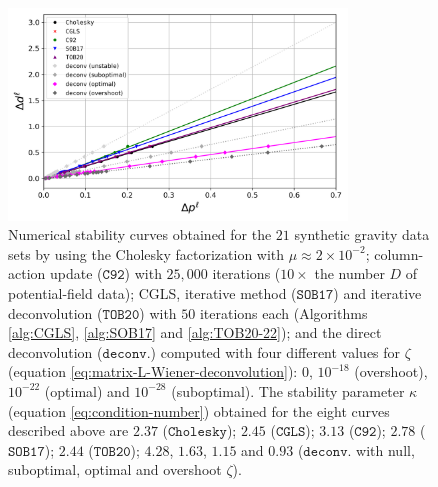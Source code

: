 \begin{figure}[htbp]
	\begin{center}
		\includegraphics[width=9cm]{Fig/stability-comparison}
	\end{center}
	\caption{
		Numerical stability curves obtained for the $21$ synthetic gravity data sets 
		by using the Cholesky factorization with $\mu \approx 2 \times 10^{-2}$; 
		column-action update ($\mathtt{C92}$) with $25,000$ iterations ($10 \times$ the number $D$ of potential-field data); 
		CGLS, iterative method ($\mathtt{SOB17}$) and iterative deconvolution
		($\mathtt{TOB20}$) with $50$ iterations each (Algorithms \ref{alg:CGLS}, \ref{alg:SOB17} and \ref{alg:TOB20-22}); 
		and the direct deconvolution ($\mathtt{deconv.}$) computed with four different values for $\zeta$ 
		(equation \ref{eq:matrix-L-Wiener-deconvolution}): $0$, $10^{-18}$ (overshoot), $10^{-22}$ (optimal)
		and $10^{-28}$ (suboptimal).
		The stability parameter $\kappa$ (equation \ref{eq:condition-number}) obtained for the eight curves described above are 
		$2.37$ ($\mathtt{Cholesky}$);
		$2.45$ ($\mathtt{CGLS}$);
		$3.13$ ($\mathtt{C92}$);
		$2.78$ ($\mathtt{SOB17}$); 
		$2.44$ ($\mathtt{TOB20}$); 
		$4.28$, $1.63$, $1.15$ and $0.93$ 
		($\mathtt{deconv.}$ with null, suboptimal, optimal and overshoot $\zeta$).
		}
	\label{fig:stability-comparison}
\end{figure}

